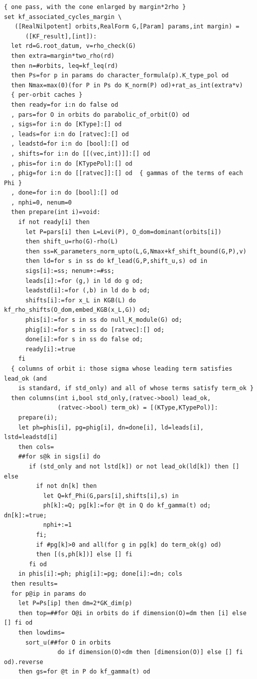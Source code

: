 \documentclass[11pt,leqno]{article}
\theoremstyle{definition}
\numberwithin{equation}{section}
\begin{document}
{\begin{verbatim}
{ one pass, with the cone enlarged by margin*2rho }
set kf_associated_cycles_margin \
   ([RealNilpotent] orbits,RealForm G,[Param] params,int margin) =
      ([KF_result],[int]):
  let rd=G.root_datum, v=rho_check(G)
  then extra=margin*two_rho(rd)
  then n=#orbits, leq=kf_leq(rd)
  then Ps=for p in params do character_formula(p).K_type_pol od
  then Nmax=max(0)(for P in Ps do K_norm(P) od)+rat_as_int(extra*v)
  { per-orbit caches }
  then ready=for i:n do false od
  , pars=for O in orbits do parabolic_of_orbit(O) od
  , sigs=for i:n do [KType]:[] od
  , leads=for i:n do [ratvec]:[] od
  , leadstd=for i:n do [bool]:[] od
  , shifts=for i:n do [[(vec,int)]]:[] od
  , phis=for i:n do [KTypePol]:[] od
  , phig=for i:n do [[ratvec]]:[] od  { gammas of the terms of each Phi }
  , done=for i:n do [bool]:[] od
  , nphi=0, nenum=0
  then prepare(int i)=void:
    if not ready[i] then
      let P=pars[i] then L=Levi(P), O_dom=dominant(orbits[i])
      then shift_u=rho(G)-rho(L)
      then ss=K_parameters_norm_upto(L,G,Nmax+kf_shift_bound(G,P),v)
      then ld=for s in ss do kf_lead(G,P,shift_u,s) od in
      sigs[i]:=ss; nenum+:=#ss;
      leads[i]:=for (g,) in ld do g od;
      leadstd[i]:=for (,b) in ld do b od;
      shifts[i]:=for x_L in KGB(L) do kf_rho_shifts(O_dom,embed_KGB(x_L,G)) od;
      phis[i]:=for s in ss do null_K_module(G) od;
      phig[i]:=for s in ss do [ratvec]:[] od;
      done[i]:=for s in ss do false od;
      ready[i]:=true
    fi
  { columns of orbit i: those sigma whose leading term satisfies lead_ok (and
    is standard, if std_only) and all of whose terms satisfy term_ok }
  then columns(int i,bool std_only,(ratvec->bool) lead_ok,
               (ratvec->bool) term_ok) = [(KType,KTypePol)]:
    prepare(i);
    let ph=phis[i], pg=phig[i], dn=done[i], ld=leads[i], lstd=leadstd[i]
    then cols=
    ##for s@k in sigs[i] do
       if (std_only and not lstd[k]) or not lead_ok(ld[k]) then [] else
         if not dn[k] then
           let Q=kf_Phi(G,pars[i],shifts[i],s) in
           ph[k]:=Q; pg[k]:=for @t in Q do kf_gamma(t) od; dn[k]:=true;
           nphi+:=1
         fi;
         if #pg[k]>0 and all(for g in pg[k] do term_ok(g) od)
         then [(s,ph[k])] else [] fi
       fi od
    in phis[i]:=ph; phig[i]:=pg; done[i]:=dn; cols
  then results=
  for p@ip in params do
    let P=Ps[ip] then dm=2*GK_dim(p)
    then top=##for O@i in orbits do if dimension(O)=dm then [i] else [] fi od
    then lowdims=
      sort_u(##for O in orbits
               do if dimension(O)<dm then [dimension(O)] else [] fi od).reverse
    then gs=for @t in P do kf_gamma(t) od

\end{verbatim}}
\end{document}
